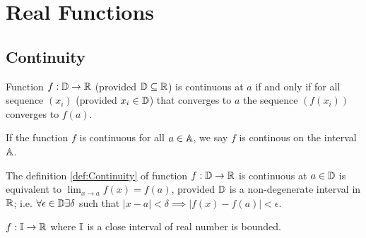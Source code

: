 \documentclass[../note.tex]{subfiles}
\begin{document}
\section{Real Functions}

\subsection{Continuity}

\begin{definition}\label{def:Continuity}
	Function $f: \mathbb{D} \rightarrow \mathbb{R}$ (provided $\mathbb{D} \subseteq \mathbb{R}$) is continuous at $a$
	if and only if for all sequence $(x_i)$ (provided $x_i \in \mathbb{D}$) that converges to $a$ the sequence $(f(x_i))$ converges to $f(a)$.

	If the function $f$ is continuous for all $a \in \mathbb{A}$, we say $f$ is continous on the interval $\mathbb{A}$.
\end{definition}

\begin{theorem}
	The definition \ref{def:Continuity} of function $f:\mathbb{D} \rightarrow \mathbb{R}$ is continuous at $a\in \mathbb{D}$ is equivalent to $\lim _{x\to a}f(x) = f(a)$, provided $\mathbb{D}$ is a non-degenerate interval in $\mathbb{R}$; 
	i.e. $\forall \epsilon \in \mathbb{D} \exists \delta $ such that $|x-a| < \delta \implies |f(x)-f(a)| < \epsilon$.
\end{theorem}

\begin{definition}
	$f:\mathbb{I} \rightarrow \mathbb{R}$ where $\mathbb{I}$ is a close interval of real number is bounded.
\end{definition}
\end{document}
